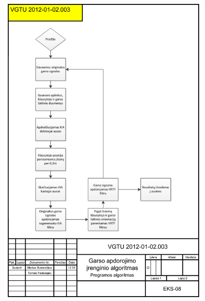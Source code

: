 \documentclass[]{vgtuef}
\begin{document}
\begin{figure}[!h]
  \centering
  \includegraphics[width=400px]{img/priedas_sound_algoritmas.png}
\end{figure}

\newpage
\end{document}
